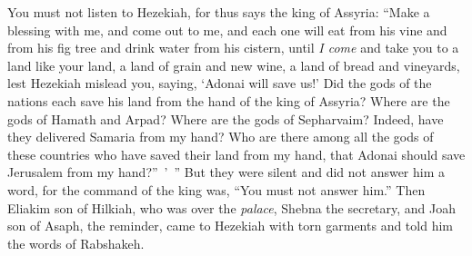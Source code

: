 \begin{biblechapter}
\verse You must not listen to Hezekiah, for thus says the king of Assyria: “Make a blessing with me, and come out to me, and each one will eat from his vine and from his fig tree and drink water from his cistern,
\verse until \textit{I come} and take you to a land like your land, a land of grain and new wine, a land of bread and vineyards,
\verse lest Hezekiah mislead you, saying, ‘Adonai will save us!’ Did the gods of the nations each save his land from the hand of the king of Assyria?
\verse Where are the gods of Hamath and Arpad? Where are the gods of Sepharvaim? Indeed, have they delivered Samaria from my hand?
\verse Who are there among all the gods of these countries who have saved their land from my hand, that Adonai should save Jerusalem from my hand?” ’ ”
\verse But they were silent and did not answer him a word, for the command of the king was, “You must not answer him.”
\verse Then Eliakim son of Hilkiah, who was over the \textit{palace}, Shebna the secretary, and Joah son of Asaph, the reminder, came to Hezekiah with torn garments and told him the words of Rabshakeh.
\end{biblechapter}

